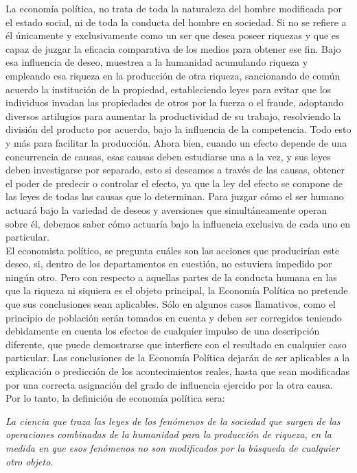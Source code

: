 La economía política, no trata de toda la naturaleza del hombre modificada por el estado social, ni de toda la conducta del hombre en sociedad. Si no se refiere a él únicamente y exclusivamente como un ser que desea poseer riquezas y que es capaz de juzgar la eficacia comparativa de los medios para obtener ese fin. Bajo esa influencia de deseo, muestrea a la humanidad acumulando riqueza y empleando esa riqueza en la producción de otra riqueza, sancionando de común acuerdo la institución de la propiedad, estableciendo leyes para evitar que los individuos invadan las propiedades de otros por la fuerza o el fraude, adoptando diversos artilugios para aumentar la productividad de su trabajo, resolviendo la división del producto por acuerdo, bajo la influencia de la competencia. Todo esto y más para facilitar la producción. Ahora bien, cuando un efecto depende de una concurrencia de causas, esas causas deben estudiarse una a la vez, y sus leyes deben investigarse por separado, esto si deseamos a través de las causas, obtener el poder de predecir o controlar el efecto, ya que la ley del efecto se compone de las leyes de todas las causas que lo determinan. Para juzgar cómo el ser humano actuará bajo la variedad de deseos y aversiones que simultáneamente operan sobre él, debemos saber cómo actuaría bajo la influencia exclusiva de cada uno en particular. \\

El economista político, se pregunta cuáles son las acciones que producirían este deseo, si, dentro de los departamentos en cuestión, no estuviera impedido por ningún otro. Pero con respecto a aquellas partes de la conducta humana en las que la riqueza ni siquiera es el objeto principal, la Economía Política no pretende que sus conclusiones sean aplicables. Sólo en algunos casos llamativos, como el principio de población serán tomados en cuenta y deben ser corregidos teniendo debidamente en cuenta los efectos de cualquier impulso de una descripción diferente, que puede demostrarse que interfiere con el resultado en cualquier caso particular. Las conclusiones de la Economía Política dejarán de ser aplicables a la explicación o predicción de los acontecimientos reales, hasta que sean modificadas por una correcta asignación del grado de influencia ejercido por la otra causa.\\

Por lo tanto, la definición de economía política sera:

\begin{center}
    \textit{La ciencia que traza las leyes de los fenómenos de la sociedad que surgen de las operaciones combinadas de la humanidad para la producción de riqueza, en la medida en que esos fenómenos no son modificados por la búsqueda de cualquier otro objeto.}
\end{center}

